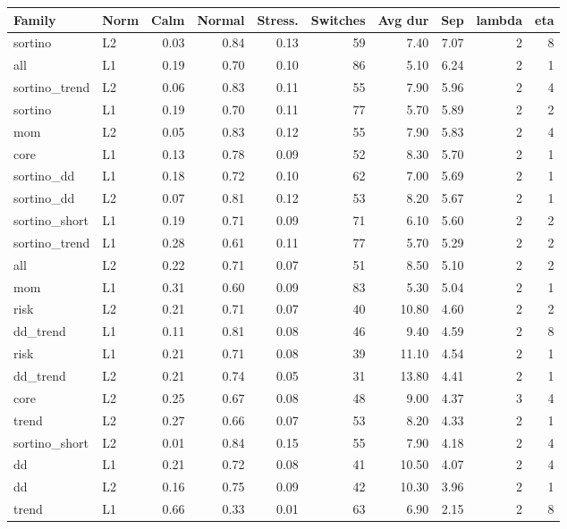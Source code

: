 \begin{tabular}{llrrrrrrrr}
\toprule
Family & Norm & Calm & Normal & Stress. & Switches & Avg dur & Sep & lambda & eta \\
\midrule
sortino & L2 & 0.03 & 0.84 & 0.13 & 59 & 7.40 & 7.07 & 2 & 8 \\
all & L1 & 0.19 & 0.70 & 0.10 & 86 & 5.10 & 6.24 & 2 & 1 \\
sortino_trend & L2 & 0.06 & 0.83 & 0.11 & 55 & 7.90 & 5.96 & 2 & 4 \\
sortino & L1 & 0.19 & 0.70 & 0.11 & 77 & 5.70 & 5.89 & 2 & 2 \\
mom & L2 & 0.05 & 0.83 & 0.12 & 55 & 7.90 & 5.83 & 2 & 4 \\
core & L1 & 0.13 & 0.78 & 0.09 & 52 & 8.30 & 5.70 & 2 & 1 \\
sortino_dd & L1 & 0.18 & 0.72 & 0.10 & 62 & 7.00 & 5.69 & 2 & 1 \\
sortino_dd & L2 & 0.07 & 0.81 & 0.12 & 53 & 8.20 & 5.67 & 2 & 1 \\
sortino_short & L1 & 0.19 & 0.71 & 0.09 & 71 & 6.10 & 5.60 & 2 & 2 \\
sortino_trend & L1 & 0.28 & 0.61 & 0.11 & 77 & 5.70 & 5.29 & 2 & 2 \\
all & L2 & 0.22 & 0.71 & 0.07 & 51 & 8.50 & 5.10 & 2 & 2 \\
mom & L1 & 0.31 & 0.60 & 0.09 & 83 & 5.30 & 5.04 & 2 & 1 \\
risk & L2 & 0.21 & 0.71 & 0.07 & 40 & 10.80 & 4.60 & 2 & 2 \\
dd_trend & L1 & 0.11 & 0.81 & 0.08 & 46 & 9.40 & 4.59 & 2 & 8 \\
risk & L1 & 0.21 & 0.71 & 0.08 & 39 & 11.10 & 4.54 & 2 & 1 \\
dd_trend & L2 & 0.21 & 0.74 & 0.05 & 31 & 13.80 & 4.41 & 2 & 1 \\
core & L2 & 0.25 & 0.67 & 0.08 & 48 & 9.00 & 4.37 & 3 & 4 \\
trend & L2 & 0.27 & 0.66 & 0.07 & 53 & 8.20 & 4.33 & 2 & 1 \\
sortino_short & L2 & 0.01 & 0.84 & 0.15 & 55 & 7.90 & 4.18 & 2 & 4 \\
dd & L1 & 0.21 & 0.72 & 0.08 & 41 & 10.50 & 4.07 & 2 & 4 \\
dd & L2 & 0.16 & 0.75 & 0.09 & 42 & 10.30 & 3.96 & 2 & 1 \\
trend & L1 & 0.66 & 0.33 & 0.01 & 63 & 6.90 & 2.15 & 2 & 8 \\
\bottomrule
\end{tabular}
